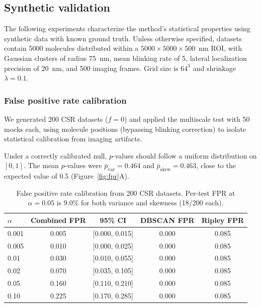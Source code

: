 \documentclass[11pt]{article}
\begin{document}
\subsection{Synthetic validation}

The following experiments characterize the method's statistical
properties using synthetic data with known ground truth. Unless otherwise
specified, datasets contain 5000 molecules distributed within a
$5000 \times 5000 \times 500$~nm ROI, with Gaussian clusters of radius
75~nm, mean blinking rate of 5, lateral localization precision of 20~nm,
and 500 imaging frames. Grid size is $64^3$ and shrinkage
$\lambda = 0.1$.

\subsubsection{False positive rate calibration}
\label{sec:exp-a}

We generated 200 CSR datasets ($f = 0$) and applied the multiscale test
with 50 mocks each, using molecule positions (bypassing blinking
correction) to isolate statistical calibration from imaging artifacts.

Under a correctly calibrated null, $p$-values should follow a uniform
distribution on $[0, 1]$. The mean $p$-values were
$\bar{p}_\mathrm{var} = 0.464$ and $\bar{p}_\mathrm{skew} = 0.463$,
close to the expected value of 0.5 (Figure~\ref{fig:fpr}A).

\begin{table}[ht]
\centering
\caption{False positive rate calibration from 200 CSR datasets. Per-test
  FPR at $\alpha = 0.05$ is 9.0\% for both variance and skewness
  (18/200 each).}
\label{tab:fpr}
\begin{tabular}{lcccc}
\toprule
$\alpha$ & Combined FPR & 95\% CI & DBSCAN FPR & Ripley FPR \\
\midrule
0.001 & 0.005 & [0.000, 0.015] & 0.000 & 0.085 \\
0.005 & 0.010 & [0.000, 0.025] & 0.000 & 0.085 \\
0.01  & 0.030 & [0.010, 0.055] & 0.000 & 0.085 \\
0.02  & 0.070 & [0.035, 0.105] & 0.000 & 0.085 \\
0.05  & 0.160 & [0.110, 0.210] & 0.000 & 0.085 \\
0.10  & 0.225 & [0.170, 0.285] & 0.000 & 0.085 \\
\bottomrule
\end{tabular}
\end{table}
\end{document}
